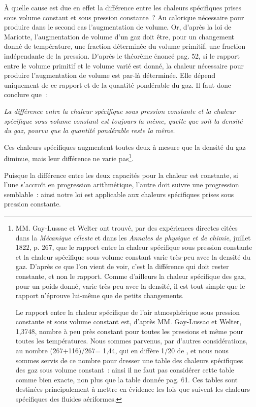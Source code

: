 \documentclass[french,twoside]{book} %
\begin{document}
À quelle cause est due en effet la différence entre les chaleurs spécifiques prises sous volume constant et sous pression constante ? Au calorique nécessaire pour produire dans le second cas l’augmentation de volume. Or, d’après la loi de Mariotte, l’augmentation de volume d’un gaz doit être, pour un changement donné de température, une fraction déterminée du volume primitif, une fraction indépendante de la pression. D’après le théorème énoncé pag. 52, si le rapport entre le volume primitif et le volume varié est donné, la chaleur nécessaire pour produire l’augmentation de volume est par-là déterminée. Elle dépend uniquement de ce rapport et de la quantité pondérable du gaz. Il faut donc conclure que :\par
\emph{La différence entre la chaleur spécifique sous pression constante et la chaleur spécifique sous volume constant est toujours la même, quelle que soit la densité du gaz, pourvu que la quantité pondérable reste la même}.\par
Ces chaleurs spécifiques augmentent toutes deux à mesure que la densité du gaz diminue, mais leur différence ne varie pas\footnote{ \noindent MM. Gay-Lussac et Welter ont trouvé, par des expériences directes citées dans la \emph{Mécanique céleste} et dans les \emph{Annales de physique et de chimie}, juillet 1822, p. 267, que le rapport entre la chaleur spécifique sous pression constante et la chaleur spécifique sous volume constant varie très-peu avec la densité du gaz. D’après ce que l’on vient de voir, c’est la différence qui doit rester constante, et non le rapport. Comme d’ailleurs la chaleur spécifique des gaz, pour un poids donné, varie très-peu avec la densité, il est tout simple que le rapport n’éprouve lui-même que de petits changements.\par
 Le rapport entre la chaleur spécifique de l’air atmosphérique sous pression constante et sous volume constant est, d’après MM. Gay-Lussac et Welter, 1,3748, nombre à peu près constant pour toutes les pressions et même pour toutes les températures. Nous sommes parvenus, par d’autres considérations, au nombre (267+116)/267= 1,44, qui en diffère 1/20 de , et nous nous sommes servis de ce nombre pour dresser une table des chaleurs spécifiques des gaz sous volume constant : ainsi il ne faut pas considérer cette table comme bien exacte, non plus que la table donnée pag. 61. Ces tables sont destinées principalement à mettre en évidence les lois que suivent les chaleurs spécifiques des fluides aériformes.
}.\par
Puisque la différence entre les deux capacités pour la chaleur est constante, si l’une s’accroît en progression arithmétique, l’autre doit suivre une progression semblable : ainsi notre loi est applicable aux chaleurs spécifiques prises sous pression constante.\par
\end{document}
